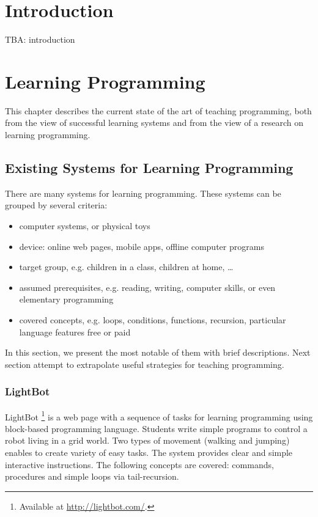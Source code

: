 \documentclass[
    digital,
    color,
    11pt,
    nocover,
    table,  %
    nolof,  %
    nolot,  %
    microtype,
]{fithesis3}
\begin{document}
\chapter{Introduction}
\label{chap:introduction}

TBA: introduction

\chapter{Learning Programming}
\label{chap:learning-programming}

This chapter describes the current state of the art of teaching programming, both from the view of successful learning systems and from the view of a research on learning programming.

\section{Existing Systems for Learning Programming}
\label{sec:existing-systems}

There are many systems for learning programming.
These systems can be grouped by several criteria:

\begin{itemize}
\item computer systems, or physical toys
\item device: online web pages, mobile apps, offline computer programs
\item target group, e.g. children in a class, children at home, …
\item assumed prerequisites, e.g. reading, writing, computer skills, or even elementary programming
\item covered concepts, e.g. loops, conditions, functions, recursion, particular language features
free or paid
\end{itemize}

In this section, we present the most notable of them with brief descriptions. Next section attempt to extrapolate useful strategies for teaching programming.


\subsection{LightBot}
\label{sec:lightbot}
LightBot%
\footnote{Available at \url{http://lightbot.com/}.}
is a web page with a sequence of tasks for learning programming using block-based programming language.
Students write simple programs to control a robot living in a grid world.
Two types of movement (walking and jumping) enables to create variety of easy tasks.
The system provides clear and simple interactive instructions.
The following concepts are covered: commands, procedures and simple loops via tail-recursion.
\end{document}
